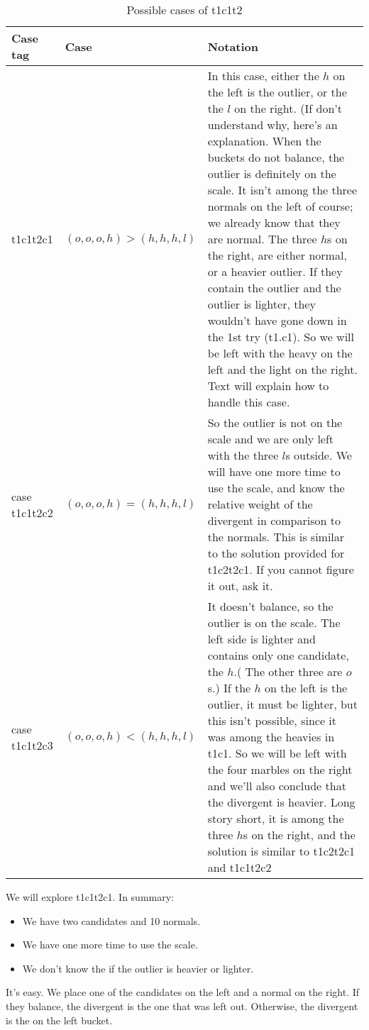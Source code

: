 \documentclass{article}
\begin{document}
\begin{table} %
	\caption{Possible cases of t1c1t2}
	\label{tbl:t1c1t2cs}
\begin{tabular}{|p{3cm}|p{5cm}|p{7cm}|}
	\hline
	Case tag& Case& Notation\\
	\hline
	\hline
	 t1c1t2c1& $(o,o,o,h)>(h,h,h,l)$& In this case, either the $h$ on the left is the outlier, or the the $l$ on the right. (If don't understand why, here's an explanation. When the buckets do not balance, the outlier is definitely on the scale. It isn't among the three normals on the left of course; we already know that they are normal. The three $h$s on the right, are either normal, or a heavier outlier. If they contain the outlier and the outlier is lighter, they wouldn't have gone down in the 1st try (t1.c1). So we will be left with the heavy on the left and the light on the right. Text will explain how to handle this case.\\
	\hline
	case t1c1t2c2&$(o,o,o,h)=(h,h,h,l)$& So the outlier is not on the scale and we are only left with the three $l$s outside. We will have one more time to use the scale, and know the relative weight of the divergent in comparison to the normals. This is similar to the solution provided for t1c2t2c1. If you cannot figure it out, ask it. \\
	\hline
	case t1c1t2c3& $(o,o,o,h)<(h,h,h,l)$& It doesn't balance, so the outlier is on the scale. The left side is lighter and contains only one candidate, the $h$.( The other three are $o$s.) If the $h$ on the left is the outlier, it must be lighter, but this isn't possible, since it was among the heavies in t1c1. So we will be left with the four marbles on the right and we'll also conclude that the divergent is heavier. Long story short, it is among the three $h$s on the right, and the solution is similar to t1c2t2c1 and t1c1t2c2\\
	\hline
\end{tabular}
\end{table} %

We will explore t1c1t2c1. In summary:
\begin{itemize}
	\item We have two candidates and 10 normals.
	\item We have one more time to use the scale.
	\item We don't know the if the outlier is heavier or lighter.
\end{itemize}
It's easy. We place one of the candidates on the left and a normal on the right. If they balance, the divergent is the one that was left out. Otherwise, the divergent is the on the left bucket.
\end{document}
